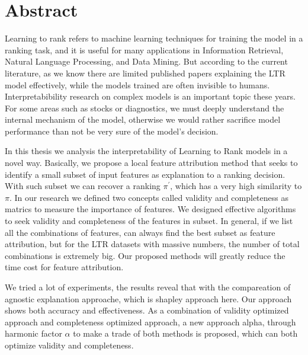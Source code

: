 \begingroup
\let\clearpage\relax
\let\cleardoublepage\relax
\let\cleardoublepage\relax

\chapter*{Abstract}
Learning to rank refers to machine learning techniques for training the model in a ranking task, and it is useful for many applications in Information Retrieval, Natural Language Processing, and Data Mining. But according to the current literature, as we know there are limited published papers explaining the LTR model effectively, while the models trained are often invisible to humans. Interpretabibility research on complex models is an important topic these years. For some areas such as stocks or diagnostics, we must deeply understand the internal mechanism of the model, otherwise we would rather sacrifice model performance than not be very sure of the model's decision.

In this thesis we analysis the interpretability of Learning to Rank models in a novel way. Basically, we propose a local feature attribution method that seeks to identify a small subset of input features as explanation to a ranking decision. With such subset we can recover a ranking $\pi ^{'}$, which has a very high similarity to $\pi$. In our research we defined two concepts called validity and completeness as matrics to measure the importance of features. We designed effective algorithms to seek validity and completeness of the features in subset. In general, if we list all the combinations of features, can always find the best subset as feature attribution, but for the LTR datasets with massive numbers, the number of total combinations is extremely big. Our proposed methods will greatly reduce the time cost for feature attribution. 

We tried a lot of experiments, the results reveal that with the compareation of agnostic explanation approache, which is shapley approach here. Our approach shows both accuracy and effectiveness. As a combination of validity optimized approach and completeness optimized approach, a new approach alpha, through harmonic factor $\alpha $ to make a trade of both methods is proposed, which can both optimize validity and completeness.


\vfill



\endgroup			

\vfill